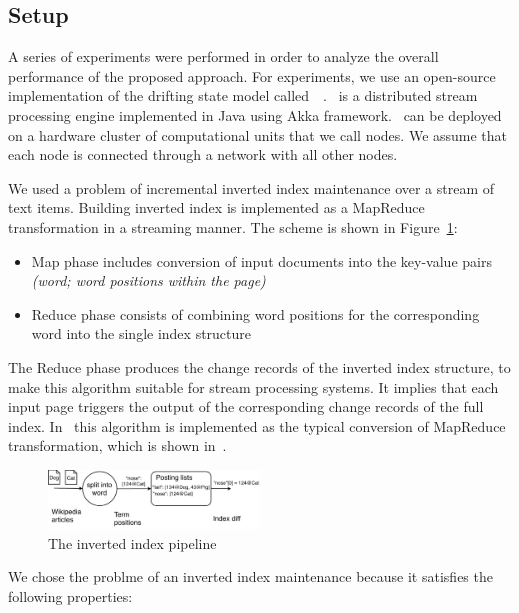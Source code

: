 
\label {fs-experiments-seciton}

\subsection{Setup}
A series of experiments were performed in order to analyze the overall performance of the proposed approach. For experiments, we use an open-source implementation of the drifting state model called~\FlameStream\ . \FlameStream\ is a distributed stream processing engine implemented in Java using Akka framework. \FlameStream\ can be deployed on a hardware cluster of computational units that we call nodes. We assume that each node is connected through a network with all other nodes.

We  used a problem of incremental inverted index maintenance over a stream of text items. 
Building inverted index is implemented as a MapReduce transformation in a streaming manner. The scheme is shown in Figure~\ref{index}: 

\begin{itemize}
    \item Map phase includes conversion of input documents into the key-value pairs {\it (word; word positions within the page)}
    \item Reduce phase consists of combining word positions for the corresponding word into the single index structure 
\end{itemize}

The Reduce phase produces  the change records of the inverted index structure, to make this algorithm suitable for stream processing systems. It implies that each input page triggers the output of the corresponding change records of the full index. In \FlameStream\ this algorithm is implemented as the typical conversion of MapReduce transformation, which is shown in~\cite{we2018seim}.

\begin{figure}[htbp]
  \centering
  \includegraphics[width=0.50\textwidth]{pics/index}
  \caption{The inverted index pipeline}
  \label {index}
\end{figure}

We chose the problme  of  an inverted index maintenance  because it satisfies the following properties:

